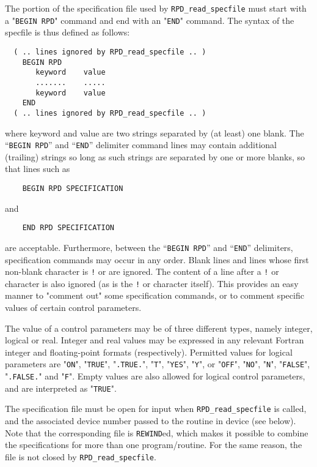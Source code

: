 \documentclass{galahad}
\newcommand{\packagename}{RPD}
\begin{document}
\begin{description}
The portion of the specification file used by
{\tt \packagename\_read\_specfile}
must start
with a "{\tt BEGIN \packagename}" command and end with an
"{\tt END}" command.  The syntax of the specfile is thus defined as follows:
\begin{verbatim}
  ( .. lines ignored by RPD_read_specfile .. )
    BEGIN RPD
       keyword    value
       .......    .....
       keyword    value
    END
  ( .. lines ignored by RPD_read_specfile .. )
\end{verbatim}
where keyword and value are two strings separated by (at least) one blank.
The ``{\tt BEGIN \packagename}'' and ``{\tt END}'' delimiter command lines
may contain additional (trailing) strings so long as such strings are
separated by one or more blanks, so that lines such as
\begin{verbatim}
    BEGIN RPD SPECIFICATION
\end{verbatim}
and
\begin{verbatim}
    END RPD SPECIFICATION
\end{verbatim}
are acceptable. Furthermore,
between the
``{\tt BEGIN \packagename}'' and ``{\tt END}'' delimiters,
specification commands may occur in any order.  Blank lines and
lines whose first non-blank character is {\tt !} or {\tt *} are ignored.
The content
of a line after a {\tt !} or {\tt *} character is also
ignored (as is the {\tt !} or {\tt *}
character itself). This provides an easy manner to "comment out" some
specification commands, or to comment specific values
of certain control parameters.

The value of a control parameters may be of three different types, namely
integer, logical or real.
Integer and real values may be expressed in any relevant Fortran integer and
floating-point formats (respectively). Permitted values for logical
parameters are "{\tt ON}", "{\tt TRUE}", "{\tt .TRUE.}", "{\tt T}",
"{\tt YES}", "{\tt Y}", or "{\tt OFF}", "{\tt NO}",
"{\tt N}", "{\tt FALSE}", "{\tt .FALSE.}" and "{\tt F}".
Empty values are also allowed for
logical control parameters, and are interpreted as "{\tt TRUE}".

The specification file must be open for
input when {\tt \packagename\_read\_specfile}
is called, and the associated device number
passed to the routine in device (see below).
Note that the corresponding
file is {\tt REWIND}ed, which makes it possible to combine the specifications
for more than one program/routine.  For the same reason, the file is not
closed by {\tt \packagename\_read\_specfile}.


\end{description}
\end{document}
